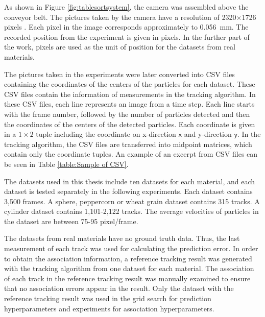 As shown in Figure \ref{fig:tablesortsystem}, the camera was assembled above the conveyor belt. The pictures taken by the camera have a resolution of 2320$\times$1726 pixels  \cite{hornberger2018}. Each pixel in the image corresponds approximately to \SI{0.056}{\milli\meter}. The recorded position from the experiment is given in pixels. In the further part of the work, pixels are used as the unit of position for the datasets from real materials.

The pictures taken in the experiments were later converted into CSV files containing the coordinates of the centers of the particles for each dataset. These CSV files contain the information of measurements in the tracking algorithm. In these CSV files, each line represents an image from a time step. Each line starts with the frame number, followed by the number of particles detected and then the coordinates of the centers of the detected particles. Each coordinate is given in a $1\times 2$ tuple including the coordinate on x-direction $\mathsf{x}$ and y-direction $\mathsf{y}$. In the tracking algorithm, the CSV files are transferred into midpoint matrices, which contain only the coordinate tuples. An example of an excerpt from CSV files can be seen in Table \ref{table:Sample of CSV}. 


The datasets used in this thesis include ten datasets for each material, and each dataset is tested separately in the following experiments. Each dataset contains 3,500 frames. A sphere, peppercorn or wheat grain dataset contains 315 tracks. A cylinder dataset contains 1,101-2,122 tracks. The average velocities of particles in the dataset are between 75-95 pixel/frame. 

The datasets from real materials have no ground truth data. Thus, the last measurement of each track was used for calculating the prediction error. In order to obtain the association information, a reference tracking result was generated with the tracking algorithm from one dataset for each material. The association of each track in the reference tracking result was manually examined to ensure that no association errors appear in the result. Only the dataset with the reference tracking result was used in the grid search for prediction hyperparameters and experiments for association hyperparameters.

